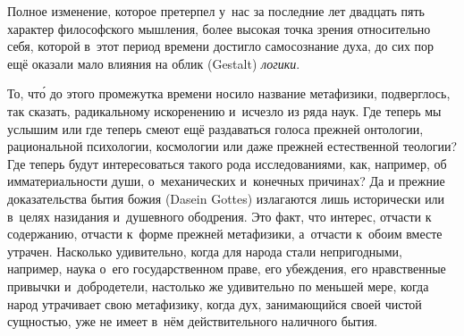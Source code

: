 Полное изменение, которое претерпел у~нас за последние лет двадцать пять
характер философского мышления, более высокая точка зрения относительно себя,
которой в~этот период времени достигло самосознание духа, до сих пор ещё
оказали мало влияния на облик (Gestalt) {\em логики}.

То, чт\'{о} до этого промежутка времени носило название метафизики,
подверглось, так сказать, радикальному искоренению и~исчезло из ряда наук. Где
теперь мы услышим или где теперь смеют ещё раздаваться голоса прежней
онтологии, рациональной психологии, космологии или даже прежней естественной
теологии? Где теперь будут интересоваться такого рода исследованиями, как,
например, об имматериальности души, о~механических и~конечных причинах? Да и
прежние доказательства бытия божия (Dasein Gottes) излагаются лишь исторически или в~целях
назидания и~душевного ободрения. Это факт, что интерес, отчасти к
содержанию, отчасти к~форме прежней метафизики, а~отчасти к~обоим вместе
утрачен. Насколько удивительно, когда для народа стали непригодными,
например, наука о~его государственном праве, его убеждения,
его нравственные привычки и~добродетели, настолько же удивительно по меньшей
мере, когда народ утрачивает свою метафизику, когда дух, занимающийся своей
чистой сущностью, уже не имеет в~нём действительного наличного бытия.


